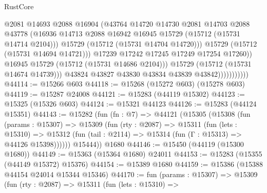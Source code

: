 \begin{lexlean}{RustCore}
\begin{coremodule}
                                    @2081
                                    @14693
                                    @2088
                                    @16904
                                    (@43764
                                      @14720
                                      @14730
                                      @2081
                                      @14703
                                      @2088
                                      @43778
                                      (@16936
                                        @14713
                                        @2088
                                        @16942
                                        @16945
                                        @15729
                                        (@15712 (@15731 @14714 @2104)))
                                      @15729
                                      (@15712 (@15731 @14704 @14720)))
                                    @15729
                                    (@15712 (@15731 @14694 @14721)))
                                  @17239
                                  @17242
                                  @17245
                                  @17249
                                  @17254
                                  @17260))
                              @16945
                              @15729
                              (@15712 (@15731 @14686 @2104)))
                            @15729
                            (@15712 (@15731 @14674 @14739)))
                          @43824
                          @43827
                          @43830
                          @43834
                          @43839
                          @43842)))))))))))
@44114 := @15266 @603
@44118 := @15268 (@15272 @603) (@15278 @603)
@44119 := @15287 @24008
@44121 := @15283 (@44119 @15302)
@44123 := @15325 (@15326 @603)
@44124 := @15321 @44123
@44126 := @15283 (@44124 @15351)
@44143 := @15282
    (fun (fn : @7) =>
    @44121
      (@15305
        (@15308
          (fun (params : @15307) =>
          @15309
            (fun (rty : @2087) =>
            @15311
              (fun (lets : @15310) =>
              @15312 (fun (tail : @2114) => @15314 (fun (Γ : @15313) => @44126 @15398))))))
        @15444))
    @1680
@44146 := @15450 (@44119 (@15300 @1680))
@44149 := @15363 (@15364 @1680) @24011
@44153 := @15283 (@15355 (@44149 @15372) @15376)
@44154 := @15389 @1680
@44159 := @15386 (@15388 @44154 @24014 @15344 @15346)
@44170 := fun (params : @15307) =>
  @15309
    (fun (rty : @2087) =>
    @15311
      (fun (lets : @15310) =>

\end{coremodule}
\end{lexlean}
